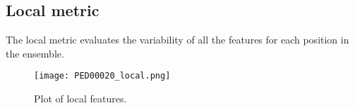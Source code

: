 \subsection{Local metric}
The local metric evaluates the variability of all the features for each position in the ensemble.

\begin{figure}[H]
	\begin{minipage}[b]{0.9\textwidth}
		\centering
		\texttt{[image: PED00020\_local.png]}
		\caption{Plot of local features.}
		\label{plot}
	\end{minipage}	
\end{figure}
